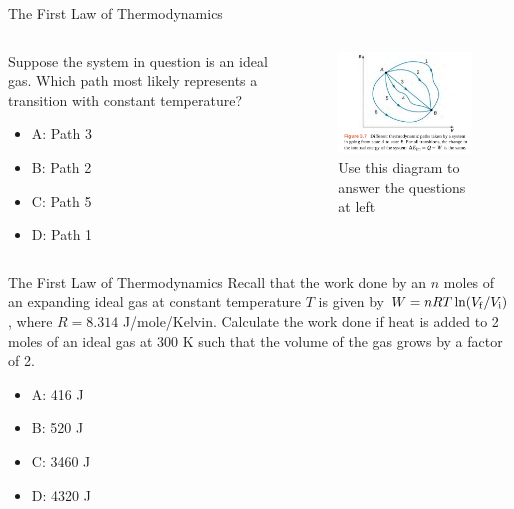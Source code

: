 \documentclass{beamer}
\begin{document}
\begin{frame}{The First Law of Thermodynamics}
\begin{columns}[T]
\begin{column}{0.5\textwidth}
\small Suppose the system in question is an ideal gas.  Which path most likely represents a transition with constant temperature?
\begin{itemize}
\item A: Path 3
\item B: Path 2
\item C: Path 5
\item D: Path 1
\end{itemize}
\end{column}
\begin{column}{0.5\textwidth}
\begin{figure}
\centering
\includegraphics[width=\textwidth]{figures/states1.png}
\caption{\label{fig:states2} Use this diagram to answer the questions at left}
\end{figure}
\end{column}
\end{columns}
\end{frame}

\begin{frame}{The First Law of Thermodynamics}
Recall that the work done by an $n$ moles of an expanding ideal gas at constant temperature $T$ is given by $W = nRT\ln(V_{\rm f}/V_{\rm i})$, where $R = 8.314$ J/mole/Kelvin.  Calculate the work done if heat is added to 2 moles of an ideal gas at 300 K such that the volume of the gas grows by a factor of 2.
\begin{itemize}
\item A: 416 J
\item B: 520 J
\item C: 3460 J
\item D: 4320 J
\end{itemize} 
\end{frame}
\end{document}
